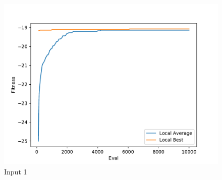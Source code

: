 \documentclass{standalone}
\begin{document}
\begin{figure}[!htb]
	\caption{Input 1}
	\label{fig:graph_1029}
	\includegraphics[width=\textwidth]{../graphs/graphs/1029.pdf}
\end{figure}
\end{document}
